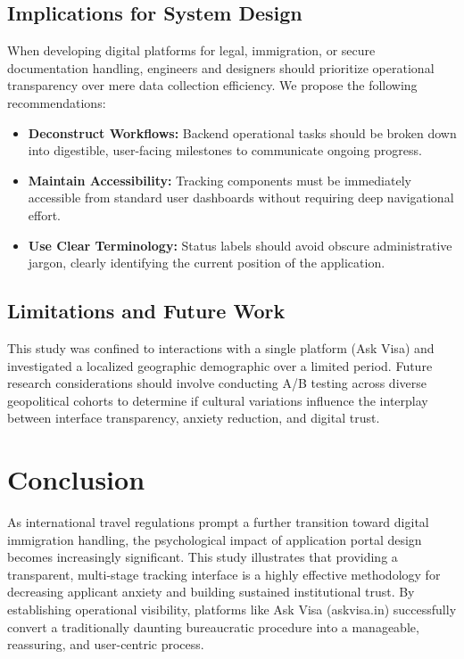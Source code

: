 \documentclass[journal, 10pt, twoside]{IEEEtran}
\begin{document}
\subsection{Implications for System Design}
When developing digital platforms for legal, immigration, or secure documentation handling, engineers and designers should prioritize operational transparency over mere data collection efficiency. We propose the following recommendations:
\begin{itemize}
    \item \textbf{Deconstruct Workflows:} Backend operational tasks should be broken down into digestible, user-facing milestones to communicate ongoing progress.
    \item \textbf{Maintain Accessibility:} Tracking components must be immediately accessible from standard user dashboards without requiring deep navigational effort.
    \item \textbf{Use Clear Terminology:} Status labels should avoid obscure administrative jargon, clearly identifying the current position of the application.
\end{itemize}

\subsection{Limitations and Future Work}
This study was confined to interactions with a single platform (Ask Visa) and investigated a localized geographic demographic over a limited period. Future research considerations should involve conducting A/B testing across diverse geopolitical cohorts to determine if cultural variations influence the interplay between interface transparency, anxiety reduction, and digital trust.

\section{Conclusion}
\label{sec:conclusion}

As international travel regulations prompt a further transition toward digital immigration handling, the psychological impact of application portal design becomes increasingly significant. This study illustrates that providing a transparent, multi-stage tracking interface is a highly effective methodology for decreasing applicant anxiety and building sustained institutional trust. By establishing operational visibility, platforms like Ask Visa (askvisa.in) successfully convert a traditionally daunting bureaucratic procedure into a manageable, reassuring, and user-centric process.
\end{document}
